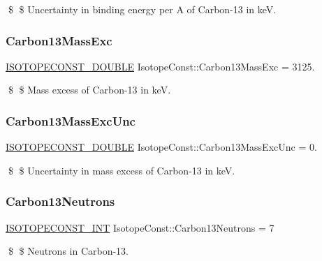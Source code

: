 \$ \$ Uncertainty in binding energy per A of Carbon-\/13 in keV. \mbox{\label{group___isotope_const-_carbon-_c13_gab17c5b1c7ca48df1079e25a8618f0a9a}} 
\subsubsection{\texorpdfstring{Carbon13\+Mass\+Exc}{Carbon13MassExc}}
{\footnotesize\ttfamily \mbox{\hyperlink{group___isotope_const-_macros_ga8f45a7272ce02c0b4c65c44636ed719a}{I\+S\+O\+T\+O\+P\+E\+C\+O\+N\+S\+T\+\_\+\+D\+O\+U\+B\+LE}} Isotope\+Const\+::\+Carbon13\+Mass\+Exc = 3125.}

\$ \$ Mass excess of Carbon-\/13 in keV. \mbox{\label{group___isotope_const-_carbon-_c13_gab33486f9665d4f3112d40d0a046b8cb5}} 
\subsubsection{\texorpdfstring{Carbon13\+Mass\+Exc\+Unc}{Carbon13MassExcUnc}}
{\footnotesize\ttfamily \mbox{\hyperlink{group___isotope_const-_macros_ga8f45a7272ce02c0b4c65c44636ed719a}{I\+S\+O\+T\+O\+P\+E\+C\+O\+N\+S\+T\+\_\+\+D\+O\+U\+B\+LE}} Isotope\+Const\+::\+Carbon13\+Mass\+Exc\+Unc = 0.}

\$ \$ Uncertainty in mass excess of Carbon-\/13 in keV. \mbox{\label{group___isotope_const-_carbon-_c13_gace9c9fc991b8d64699dc4afa13952963}} 
\subsubsection{\texorpdfstring{Carbon13\+Neutrons}{Carbon13Neutrons}}
{\footnotesize\ttfamily \mbox{\hyperlink{group___isotope_const-_macros_ga5f18360b3e99483a35c32d789e62621c}{I\+S\+O\+T\+O\+P\+E\+C\+O\+N\+S\+T\+\_\+\+I\+NT}} Isotope\+Const\+::\+Carbon13\+Neutrons = 7}

\$ \$ Neutrons in Carbon-\/13. \mbox{\label{group___isotope_const-_carbon-_c13_gad76b37bb648ac804bf208c911e9a6ea3}} 
